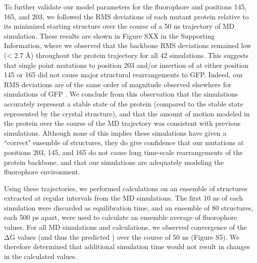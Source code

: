 To further validate our model parameters for the fluorophore and positions 145, 165, and 203, we followed the RMS deviations of each mutant protein relative to its minimized starting structure over the course of a 50 \si{\ns} trajectory of MD simulation.
These results are shown in Figure SXX in the Supporting Information, where we observed that the backbone RMS deviations remained low (< 2.7 \si{\angstrom}) throughout the protein trajectory for all 42 simulations.
This suggests that single point mutations to position 203 and/or insertion of \pCNF{} at either position 145 or 165 did not cause major structural rearrangements to GFP.
Indeed, our RMS deviations are of the same order of magnitude observed elsewhere for simulations of GFP \cite{Nifosi2003, Reuter2002}.
We conclude from this observation that the simulations accurately represent a stable state of the protein (compared to the stable state represented by the crystal structure), and that the amount of motion modeled in the protein over the course of the MD trajectory was consistent with previous simulations.
Although none of this implies these simulations have given a ``correct" ensemble of structures, they do give confidence that our mutations at positions 203, 145, and 165 do not cause long time-scale rearrangements of the protein backbone, and that our simulations are adequately modeling the fluorophore environment. 

Using these trajectories, we performed \pKa{} calculations on an ensemble of structures extracted at regular intervals from the MD simulations.
The first 10 \si{\ns} of each simulation were discarded as equilibration time, and an ensemble of 80 structures, each 500 ps apart, were used to calculate an ensemble average of fluorophore \pKa{} values.
For all MD simulations and \pKa{} calculations, we observed convergence of the ΔG values (and thus the predicted \pKa{}) over the course of 50 \si{\ns} (Figure S5).
We therefore determined that additional simulation time would not result in changes in the calculated \pKa{} values. 

